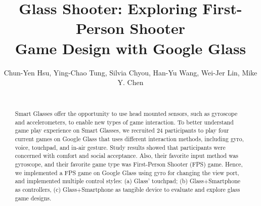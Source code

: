 \documentclass{sigchi}
\begin{document}
\title{Glass Shooter: Exploring First-Person Shooter\\ Game Design with Google Glass}

\author{\alignauthor Chun-Yen Hsu, Ying-Chao Tung, Silvia Chyou, Han-Yu Wang, Wei-Jer Lin, Mike Y. Chen \\
 \\ 
}



\maketitle



\begin{abstract}
Smart Glasses offer the opportunity to use head mounted sensors, such as gyroscope and accelerometers, to enable new types of game interaction. To better understand game play experience on Smart Glasses, we recruited 24 participants to play four current games on Google Glass that uses different interaction methods, including gyro, voice, touchpad, and in-air gesture. Study results showed that participants were concerned with comfort and social acceptance. Also, their favorite input method was gyroscope, and their favorite game type was First-Person Shooter (FPS) game. Hence, we implemented a FPS game on Google Glass using gyro for changing the view port, and implemented multiple control styles: (a) Glass' touchpad; (b) Glass+Smartphone as controllers, (c) Glass+Smartphone as tangible device to evaluate and explore glass game designs.
\end{abstract}
\end{document}
